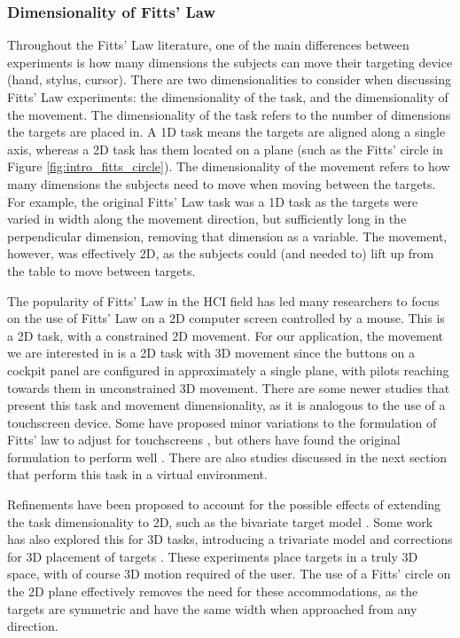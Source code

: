\subsubsection{Dimensionality of Fitts' Law}\label{dimensionality-of-fitts-law}

Throughout the Fitts' Law literature, one of the main differences between experiments is how many dimensions the subjects can move their targeting device (hand, stylus, cursor).
There are two dimensionalities to consider when discussing Fitts' Law experiments: the dimensionality of the task, and the dimensionality of the movement.
The dimensionality of the task refers to the number of dimensions the targets are placed in.
A 1D task means the targets are aligned along a single axis, whereas a 2D task has them located on a plane (such as the Fitts' circle in Figure \ref{fig:intro_fitts_circle}).
The dimensionality of the movement refers to how many dimensions the subjects need to move when moving between the targets.
For example, the original Fitts' Law task was a 1D task as the targets were varied in width along the movement direction, but sufficiently long in the perpendicular dimension, removing that dimension as a variable.
The movement, however, was effectively 2D, as the subjects could (and needed to) lift up from the table to move between targets.

The popularity of Fitts' Law in the HCI field has led many researchers to focus on the use of Fitts' Law on a 2D computer screen controlled by a mouse.
This is a 2D task, with a constrained 2D movement.
For our application, the movement we are interested in is a 2D task with 3D movement since the buttons on a cockpit panel are configured in approximately a single plane, with pilots reaching towards them in unconstrained 3D movement.
There are some newer studies that present this task and movement dimensionality, as it is analogous to the use of a touchscreen device.
Some have proposed minor variations to the formulation of Fitts' law to adjust for touchscreens \citep{bi_ffitts_2013,sears_high_1991}, but others have found the original formulation to perform well \citep{mackenzie_fitts_2015}.
There are also studies discussed in the next section that perform this task in a virtual environment.

Refinements have been proposed to account for the possible effects of extending the task dimensionality to 2D, such as the bivariate target model \citep{accot_refining_2003, mackenzie_extending_1992, wobbrock_error_2008}.
Some work has also explored this for 3D tasks, introducing a trivariate model \citep{grossman_pointing_2004} and corrections for 3D placement of targets \citep{cha_extended_2013, murata_extending_2001}.
These experiments place targets in a truly 3D space, with of course 3D motion required of the user.
The use of a Fitts' circle on the 2D plane effectively removes the need for these accommodations, as the targets are symmetric and have the same width when approached from any direction.

